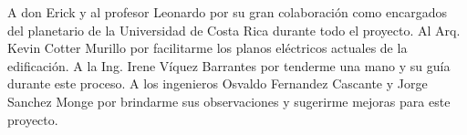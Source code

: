
\begin{agradecimientos}

A don Erick y al profesor Leonardo por su gran colaboración como encargados del planetario de la Universidad de Costa Rica durante todo el proyecto. Al Arq. Kevin Cotter Murillo por facilitarme los planos eléctricos actuales de la edificación. A la Ing. Irene Víquez Barrantes por tenderme una mano y su guía durante este proceso. A los ingenieros Osvaldo Fernandez Cascante y Jorge Sanchez Monge por brindarme sus observaciones y sugerirme mejoras para este proyecto.

\end{agradecimientos}